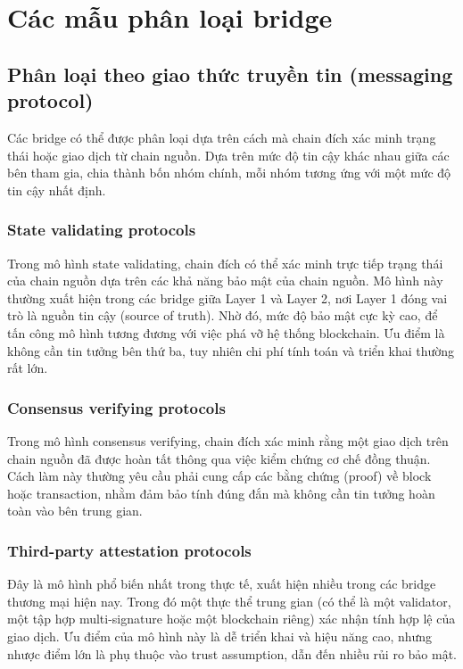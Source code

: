 \section{Các mẫu phân loại bridge}

\subsection{Phân loại theo giao thức truyền tin (messaging protocol)}

Các bridge có thể được phân loại dựa trên cách mà chain đích xác minh trạng thái hoặc giao dịch 
từ chain nguồn. Dựa trên mức độ tin cậy khác nhau giữa các bên tham gia, chia thành bốn nhóm chính, 
mỗi nhóm tương ứng với một mức độ tin cậy nhất định.

\subsubsection*{State validating protocols}

Trong mô hình state validating, chain đích có thể xác minh trực tiếp trạng thái của chain nguồn 
dựa trên các khả năng bảo mật của chain nguồn. 
Mô hình này thường xuất hiện trong các bridge giữa Layer 1 và Layer 2,
nơi Layer 1 đóng vai trò là nguồn tin cậy (source of truth). 
Nhờ đó, mức độ bảo mật cực kỳ cao, để tấn công mô hình tương đương với việc phá vỡ hệ thống blockchain.
Ưu điểm là không cần tin tưởng bên thứ ba, tuy nhiên chi phí tính toán và triển khai thường rất lớn.

\subsubsection*{Consensus verifying protocols}

Trong mô hình consensus verifying, 
chain đích xác minh rằng một giao dịch trên chain nguồn đã được hoàn tất 
thông qua việc kiểm chứng cơ chế đồng thuận. 
Cách làm này thường yêu cầu phải cung cấp các bằng chứng (proof) về block hoặc transaction,
nhằm đảm bảo tính đúng đắn mà không cần tin tưởng hoàn toàn vào bên trung gian.

\subsubsection*{Third-party attestation protocols}

Đây là mô hình phổ biến nhất trong thực tế, xuất hiện nhiều trong các bridge thương mại hiện nay. 
Trong đó một thực thể trung gian (có thể là một validator, một tập hợp multi-signature 
hoặc một blockchain riêng) xác nhận tính hợp lệ của giao dịch. 
Ưu điểm của mô hình này là dễ triển khai và hiệu năng cao, 
nhưng nhược điểm lớn là phụ thuộc vào trust assumption, dẫn đến nhiều rủi ro bảo mật.

